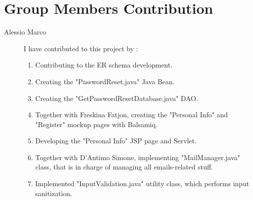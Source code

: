 \section{Group Members Contribution}


\begin{description}

	\item[Alessio Marco] I have contributed to this project by :
	\begin{enumerate}
		\item Contributing to the ER schema development.
		\item Creating the "PasswordReset.java" Java Bean.
		\item Creating the "GetPasswordResetDatabase.java" DAO.
		\item Together with Freskina Fatjon, creating the "Personal Info" and "Register" mockup pages with Balsamiq.
		\item Developing the "Personal Info" JSP page and Servlet.
		\item Together with D'Antimo Simone, implementing "MailManager.java" class, that is in charge of managing all emails-related stuff.
		\item Implemented "InputValidation.java" utility class, which performs input sanitization.
	\end{enumerate}


\end{description}
